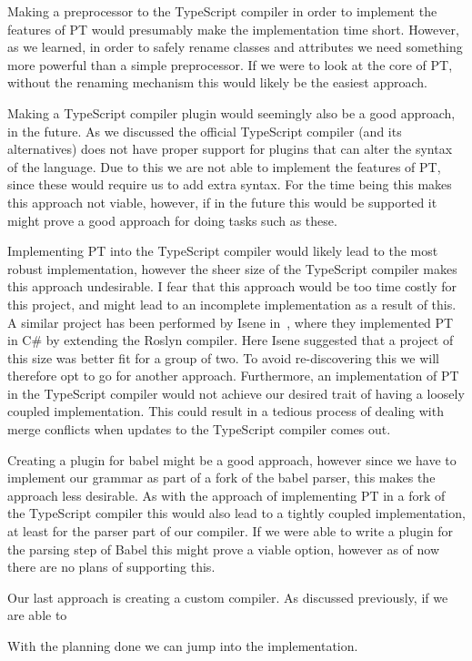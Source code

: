 Making a preprocessor to the TypeScript compiler in order to implement the features of PT would presumably make the implementation time short.
However, as we learned, in order to safely rename classes and attributes we need something more powerful than a simple preprocessor.
If we were to look at the core of PT, without the renaming mechanism this would likely be the easiest approach.

Making a TypeScript compiler plugin would seemingly also be a good approach, in the future.
As we discussed the official TypeScript compiler (and its alternatives) does not have proper support for plugins that can alter the syntax of the language.
Due to this we are not able to implement the features of PT, since these would require us to add extra syntax.
For the time being this makes this approach not viable, however, if in the future this would be supported it might prove a good approach for doing tasks such as these.

Implementing PT into the TypeScript compiler would likely lead to the most robust implementation, however the sheer size of the TypeScript compiler makes this approach undesirable.
I fear that this approach would be too time costly for this project, and might lead to an incomplete implementation as a result of this.
A similar project has been performed by Isene in~\cite{Isene2018}, where they implemented PT in C\# by extending the Roslyn compiler.
Here Isene suggested that a project of this size was better fit for a group of two.
To avoid re-discovering this we will therefore opt to go for another approach.
Furthermore, an implementation of PT in the TypeScript compiler would not achieve our desired trait of having a loosely coupled implementation.
This could result in a tedious process of dealing with merge conflicts when updates to the TypeScript compiler comes out.

Creating a plugin for babel might be a good approach, however since we have to implement our grammar as part of a fork of the babel parser, this makes the approach less desirable.
As with the approach of implementing PT in a fork of the TypeScript compiler this would also lead to a tightly coupled implementation, at least for the parser part of our compiler.
If we were able to write a plugin for the parsing step of Babel this might prove a viable option, however as of now there are no plans of supporting this.

Our last approach is creating a custom compiler.
As discussed previously, if we are able to %

With the planning done we can jump into the implementation.